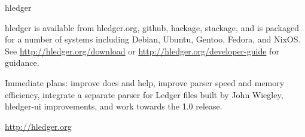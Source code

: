 \begin{hcarentry}[updated]{hledger}

hledger is available from hledger.org, github, hackage, stackage, and
is packaged for a number of systems including Debian, Ubuntu, Gentoo,
Fedora, and NixOS.  See \url{http://hledger.org/download} or
\url{http://hledger.org/developer-guide} for guidance.


Immediate plans: 
improve docs and help,
improve parser speed and memory efficiency, 
integrate a separate parser for Ledger files built by John Wiegley,
hledger-ui improvements,
and work towards the 1.0 release.

\FurtherReading
  \url{http://hledger.org}
\end{hcarentry}


